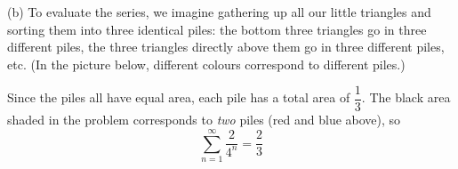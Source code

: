 \begin{solution}
\noindent (b) To evaluate the series,  we imagine gathering up all our little triangles and sorting them into three identical piles: the bottom three triangles go in three different piles, the three triangles directly above them go in three different piles, etc. (In the picture below, different colours correspond to different piles.)

\begin{center}
\end{center}

Since the piles all have equal area, each pile has a total area of $\dfrac 13$. The  black area shaded in the problem corresponds to \emph{two} piles (red and blue above), so
\[\sum_{n=1}^\infty \frac{2}{4^n}=\frac23\]
\end{solution}

